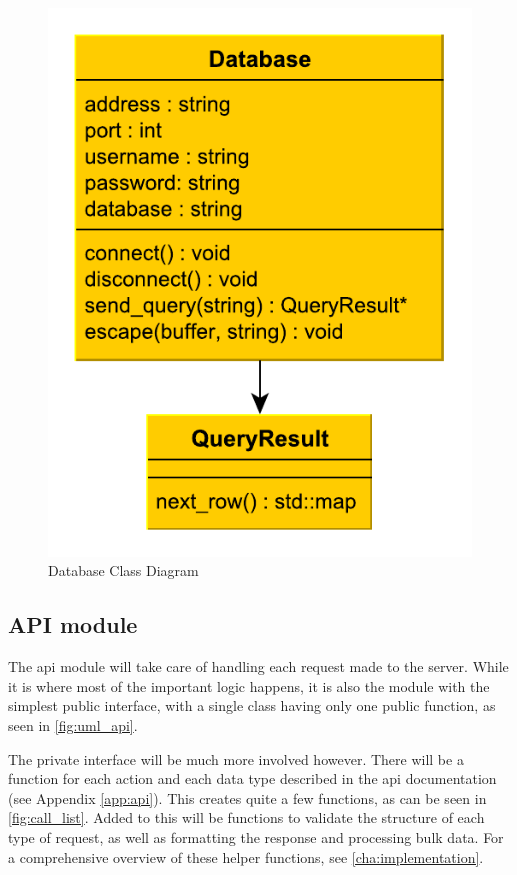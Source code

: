\begin{figure}[ht]
\includegraphics[scale=1]{img/database.pdf}
\caption{Database Class Diagram}
\label{fig:uml_database}
\end{figure}

\subsection{API module}

The \ac{api} module will take care of handling each request made to the server. While it is where most of the important logic happens, it is also the module with the simplest public interface, with a single class having only one public function, as seen in \autoref{fig:uml_api}.

The private interface will be much more involved however. There will be a function for each action and each data type described in the \ac{api} documentation (see Appendix \autoref{app:api}).
This creates quite a few functions, as can be seen in \autoref{fig:call_list}. Added to this will be functions to validate the structure of each type of request, as well as formatting the response and processing bulk data.
For a comprehensive overview of these helper functions, see \autoref{cha:implementation}.

